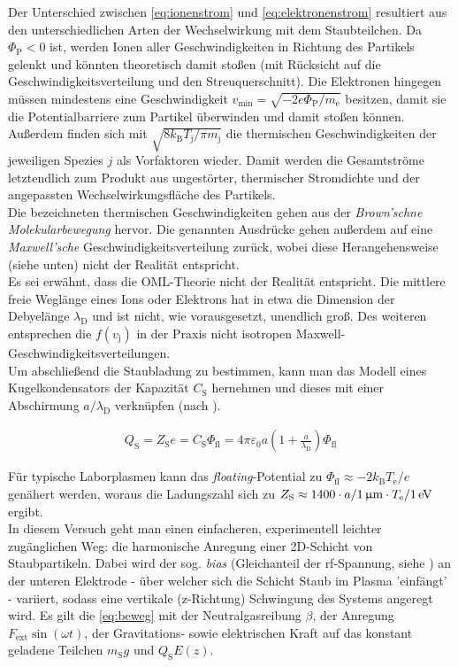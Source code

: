 \documentclass[numbers=noenddot,a4paper,notitlepage,twoside,BCOR15mm]{scrartcl}
\newcommand{\ix}[1]{_\text{#1}}
\newcommand{\tilt}[1]{\textit{#1}}
\begin{document}
		Der Unterschied zwischen \autoref{eq:ionenstrom} und \autoref{eq:elektronenstrom} resultiert aus den unterschiedlichen Arten der Wechselwirkung mit dem Staubteilchen. Da $\Phi\ix{P}<0$ ist, werden Ionen aller Geschwindigkeiten in Richtung des Partikels gelenkt und könnten theoretisch damit stoßen (mit Rücksicht auf die Geschwindigkeitsverteilung und den Streuquerschnitt). Die Elektronen hingegen müssen mindestens eine Geschwindigkeit $v\ix{min}=\sqrt{-2e\Phi\ix{P}/m\ix{e}}$ besitzen, damit sie die Potentialbarriere zum Partikel überwinden und damit stoßen können. Au{\ss}erdem finden sich mit $\sqrt{8k\ix{B}T\ix{j}/\pi m\ix{j}}$ die thermischen Geschwindigkeiten der jeweiligen Spezies $j$ als Vorfaktoren wieder. Damit werden die Gesamtstr\"ome letztendlich zum Produkt aus ungest\"orter, thermischer Stromdichte und der angepassten Wechselwirkungsfl\"ache des Partikels. \\
		Die bezeichneten thermischen Geschwindigkeiten gehen aus der \tilt{Brown'schne Molekularbewegung} hervor. Die genannten Ausdrücke gehen außerdem auf eine \tilt{Maxwell'sche} Geschwindigkeitsverteilung  zurück, wobei diese Herangehensweise (siehe unten) nicht der Realität entspricht.\\
		Es sei erwähnt, dass die OML-Theorie nicht der Realität entspricht. Die mittlere freie Weglänge eines Ions oder Elektrons hat in etwa die Dimension der Debyelänge $\lambda\ix{D}$ und ist nicht, wie vorausgesetzt, unendlich groß. Des weiteren entsprechen die $f\left(v\ix{j}\right)$ in der Praxis nicht isotropen Maxwell-Geschwindigkeitsverteilungen.\\
		Um abschließend die Staubladung zu bestimmen, kann man das Modell eines Kugelkondensators der Kapazität $C\ix{S}$ hernehmen und dieses mit einer Abschirmung $a/\lambda\ix{D}$ verknüpfen (nach \cite{Melzer12}).

			\begin{align}
				Q\ix{S}=Z\ix{S}e=C\ix{S}\Phi\ix{fl}=4\pi\varepsilon\ix{0}a\left(1+\frac{a}{\lambda\ix{D}}\right)\Phi\ix{fl} \label{eq:ladung}
			\end{align}

		Für typische Laborplasmen kann das \tilt{floating}-Potential zu $\Phi\ix{fl}\approx-2k\ix{B}T\ix{e}/e$ genähert werden, woraus die Ladungszahl sich zu $Z\ix{S}\approx1400\cdot a/\unit[1]{\upmu m}\cdot T\ix{e}/\unit[1]{eV}$ ergibt.\\
		In diesem Versuch geht man einen einfacheren, experimentell leichter zugänglichen Weg: die harmonische Anregung einer 2D-Schicht von Staubpartikeln. Dabei wird der sog. \tilt{bias} (Gleichanteil der rf-Spannung, siehe \cite{Piel10}) an der unteren Elektrode - über welcher sich die Schicht Staub im Plasma 'einfängt' - variiert, sodass eine vertikale (z-Richtung) Schwingung des Systems angeregt wird. Es gilt die \autoref{eq:beweg} mit der Neutralgasreibung $\beta$, der Anregung $F\ix{ext}\sin(\omega t)$, der Gravitations- sowie elektrischen Kraft auf das konstant geladene Teilchen $m\ix{S}g$ und $Q\ix{S}E(z)$.
\end{document}
